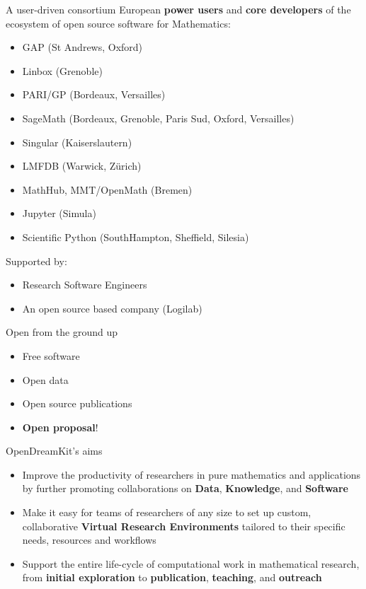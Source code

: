 \documentclass{beamer}
\begin{document}
\begin{frame}{A user-driven consortium}
  {European \textbf{power users} and \textbf{core developers} of the
      ecosystem of open source software for Mathematics:}
    \begin{itemize}
    \item GAP (St Andrews, Oxford)
    \item Linbox (Grenoble)
    \item PARI/GP (Bordeaux, Versailles)
    \item SageMath (Bordeaux, Grenoble, Paris Sud, Oxford, Versailles)
    \item Singular (Kaiserslautern)
    \item LMFDB (Warwick, Zürich)
    \item MathHub, MMT/OpenMath (Bremen)
    \item Jupyter (Simula)
    \item Scientific Python (SouthHampton, Sheffield, Silesia)
    \end{itemize}
  \pause\medskip
  \begin{block}{Supported by:}
    \begin{itemize}
    \item Research Software Engineers
    \item An open source based company (Logilab)
    \end{itemize}
  \end{block}
\end{frame}

\begin{frame}{Open from the ground up}
  \begin{itemize}
  \item Free software
  \item Open data
  \item Open source publications
    \pause
  \item \textbf{Open proposal}!
  \end{itemize}
\end{frame}

\begin{frame}{OpenDreamKit's aims}
  \begin{itemize}
  \item Improve the productivity of researchers in pure mathematics and
    applications by further promoting collaborations on \textbf{Data},
    \textbf{Knowledge}, and \textbf{Software}
  \item Make it easy for teams of researchers of any size to set up
    custom, collaborative \textbf{Virtual Research Environments}
    tailored to their specific needs, resources and workflows
  \item Support the entire life-cycle of computational work in
    mathematical research, from \textbf{initial exploration} to
    \textbf{publication}, \textbf{teaching}, and \textbf{outreach}
  \end{itemize}
\end{frame}
\end{document}

